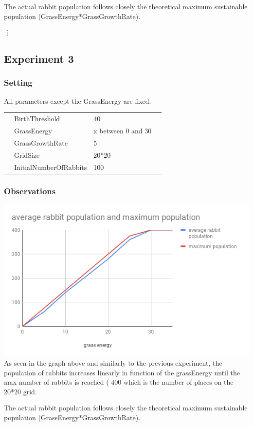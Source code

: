 \documentclass[11pt]{article}
\begin{document}
 The actual rabbit population follows closely the theoretical maximum sustainable population (GrassEnergy*GrassGrowthRate).

 \vdots

 \subsection{Experiment 3}
 \subsubsection{Setting}
 All parameters except the GrassEnergy are fixed:
 \begin{table}[H]
  \begin{tabular}{llll}
   &BirthThreshold  &40\\
   &GrassEnergy  &x between 0 and 30 \\
   &GrassGrowthRate  &5\\
   &GridSize  &20*20\\
   &InitialNumberOfRabbits  &100
  \end{tabular}
 \end{table}

 \subsubsection{Observations}
 \includegraphics[width=\textwidth]{grassenergy.png}
 As seen in the graph above and similarly to the previous experiment, the population of rabbits increases linearly in function of the grassEnergy until the max number of rabbits is reached ( 400 which is the number of places on the 20*20 grid.

 The actual rabbit population follows closely the theoretical maximum sustainable population (GrassEnergy*GrassGrowthRate).
\end{document}
